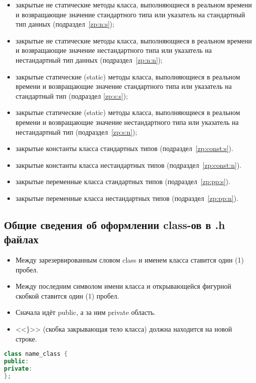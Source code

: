 \begin{enumerate}
\begin{itemize}
		\item закрытые не статические методы класса, выполняющиеся в реальном времени и возвращающие значение стандартного типа или указатель на стандартный тип данных (подраздел~\ref{zp:n:s});
		\item закрытые не статические методы класса, выполняющиеся в реальном времени и возвращающие значение нестандартного типа или указатель на нестандартный тип данных (подраздел~\ref{zp:n:n});
		\item закрытые статические (static) методы класса, выполняющиеся в реальном времени и возвращающие значение стандартного типа или указатель на стандартный тип (подраздел \ref{zp:s:s});
		\item закрытые статические (static) методы класса, выполняющиеся в реальном времени и возвращающие значение нестандартного типа или указатель на нестандартный тип (подраздел~\ref{zp:s:n});
		\item закрытые константы класса стандартных типов (подраздел~\ref{zp:const:s}).
		\item закрытые константы класса нестандартных типов (подраздел~\ref{zp:const:n}).
		\item закрытые переменные класса стандартных типов (подраздел~\ref{zp:pp:s}).
		\item закрытые переменные класса нестандартных типов (подраздел~\ref{zp:pp:n}).
	\end{itemize}
\end{enumerate}

\subsection{Общие сведения об оформлении class-ов в .h файлах}\label{OBK}
\begin{itemize}
	\item Между зарезервированным словом class и именем класса ставится один (1) пробел.
	\item Между последним символом имени класса и открывающейся фигурной скобкой ставится один (1) пробел.
	\item Сначала идёт public, а за ним private область.
	\item <<\}>> (скобка закрывающая тело класса) должна находится на новой строке.
\end{itemize}\begin{lstlisting}[language=C++, frame=tlBR, basicstyle=\fontsize{10}{10}\ttfamily]
class name_class {
public:
private:
};\end{lstlisting}

